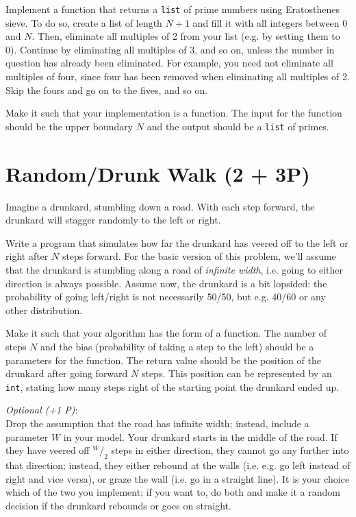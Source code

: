 \documentclass[
	english,
	fontsize=10pt,
	parskip=half,
	titlepage=true,
	DIV=12
]{scrartcl}
\newcommand*{\inPy}[1]{\texttt{#1}}
\newcommand*{\ie}{i.\;e. }
\newcommand*{\eg}{e.\;g. }
\begin{document}
Implement a function that returns a \inPy{list} of prime numbers using Eratosthenes sieve. To do so, create a list of length $N+1$ and fill it with all integers between $0$ and $N$. Then, eliminate all multiples of 2 from your list (\eg by setting them to 0). Continue by eliminating all multiples of 3, and so on, unless the number in question has already been eliminated. For example, you need not eliminate all multiples of four, since four has been removed when eliminating all multiples of 2. Skip the fours and go on to the fives, and so on.

Make it such that your implementation is a function. The input for the function should be the upper boundary $N$ and the output should be a \inPy{list} of primes.


\section{Random/Drunk Walk (2 + 3\;P)}
Imagine a drunkard, stumbling down a road. With each step forward, the drunkard will stagger randomly to the left or right.

Write a program that simulates how far the drunkard has veered off to the left or right after $N$ steps forward. For the basic version of this problem, we'll assume that the drunkard is stumbling along a road of \emph{infinite width}, \ie going to either direction is always possible. Assume now, the drunkard is a bit lopsided: the probability of going left/right is not necessarily 50/50, but \eg 40/60 or any other distribution.

Make it such that your algorithm has the form of a function. The number of steps $N$ and the bias (probability of taking a step to the left) should be a parameters for the function. The return value should be the position of the drunkard after going forward $N$ steps. This position can be represented by an \inPy{int}, stating how many steps right of the starting point the drunkard ended up.

\emph{Optional (+1 P)}:\\
Drop the assumption that the road has infinite width; instead, include a parameter $W$ in your model. Your drunkard starts in the middle of the road. If they have veered off $^{W}/_{2}$ steps in either direction, they cannot go any further into that direction; instead, they either rebound at the walls (\ie \eg go left instead of right and vice versa), or graze the wall (\ie go in a straight line). It is your choice which of the two you implement; if you want to, do both and make it a random decision if the drunkard rebounds or goes on straight.
\end{document}
